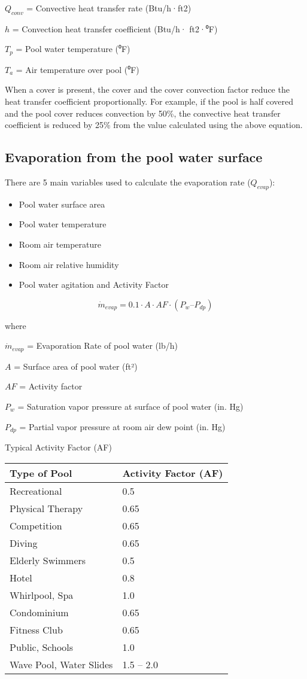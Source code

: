 \(Q_{conv}\) = Convective heat transfer rate (Btu/h·ft2)

\(h\) = Convection heat transfer coefficient (Btu/h· ft2·⁰F)

\(T_p\) = Pool water temperature (⁰F)

\(T_a\) = Air temperature over pool (⁰F)

When a cover is present, the cover and the cover convection factor reduce the heat transfer coefficient proportionally. For example, if the pool is half covered and the pool cover reduces convection by 50\%, the convective heat transfer coefficient is reduced by 25\% from the value calculated using the above equation.

\subsection{Evaporation from the pool water surface}\label{evaporation-from-the-pool-water-surface}

There are 5 main variables used to calculate the evaporation rate (\(Q_{evap}\)):

\begin{itemize}
\tightlist
\item
  Pool water surface area
\item
  Pool water temperature
\item
  Room air temperature
\item
  Room air relative humidity
\item
  Pool water agitation and Activity Factor
\end{itemize}

\begin{equation}
\dot{m}_{evap} = 0.1 \cdot A \cdot AF \cdot (P_w – P_{dp})
\end{equation}

where

\(\dot{m}_{evap}\) = Evaporation Rate of pool water (lb/h)

\(A\) = Surface area of pool water (ft²)

\(AF\) = Activity factor

\(P_w\) = Saturation vapor pressure at surface of pool water (in. Hg)

\(P_{dp}\) = Partial vapor pressure at room air dew point (in. Hg)

Typical Activity Factor (AF)

\begin{longtable}[c]{@{}ll@{}}
\toprule 
Type of Pool & Activity Factor (AF) \tabularnewline \midrule
\endhead
Recreational & 0.5 \tabularnewline
Physical Therapy & 0.65 \tabularnewline
Competition & 0.65 \tabularnewline
Diving & 0.65 \tabularnewline
Elderly Swimmers & 0.5 \tabularnewline
Hotel & 0.8 \tabularnewline
Whirlpool, Spa & 1.0 \tabularnewline
Condominium & 0.65 \tabularnewline
Fitness Club & 0.65 \tabularnewline
Public, Schools & 1.0 \tabularnewline
Wave Pool, Water Slides & 1.5 – 2.0 \tabularnewline
\bottomrule
\end{longtable}


